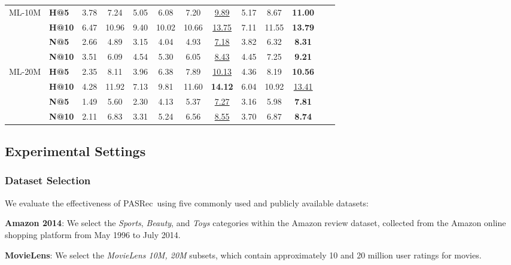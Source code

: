 \documentclass[sigconf,nonacm]{acmart}
\newcommand{\modelname}{PASRec}
\begin{document}
\begin{table}[htbp]
\begin{adjustbox}{max width=\textwidth}
\begin{tabular}{llccccccccccc}
\midrule


\multirow{4}{*}{ML-10M}
& \textbf{H@5}     & 3.78  & 7.24  & 5.05  & 6.08  & 7.20  & \underline{9.89}  & 5.17  & 8.67  & \textbf{11.00} \\
& \textbf{H@10}    & 6.47  & 10.96 & 9.40  & 10.02 & 10.66 & \underline{13.75} & 7.11  & 11.55 & \textbf{13.79} \\
& \textbf{N@5}     & 2.66  & 4.89  & 3.15  & 4.04  & 4.93  & \underline{7.18}  & 3.82  & 6.32  & \textbf{8.31} \\
& \textbf{N@10}    & 3.51  & 6.09  & 4.54  & 5.30  & 6.05  & \underline{8.43}  & 4.45  & 7.25  & \textbf{9.21} \\

\midrule

\multirow{4}{*}{ML-20M}

& \textbf{H@5}     & 2.35  & 8.11  & 3.96  & 6.38  & 7.89  & \underline{10.13}  & 4.36  & 8.19  & \textbf{10.56} \\
& \textbf{H@10}    & 4.28  & 11.92 & 7.13  & 9.81  & 11.60 & \textbf{14.12}  & 6.04  & 10.92 & \underline{13.41} \\
& \textbf{N@5}     & 1.49  & 5.60  & 2.30  & 4.13  & 5.37  & \underline{7.27}   & 3.16  & 5.98  & \textbf{7.81}  \\
& \textbf{N@10}    & 2.11  & 6.83  & 3.31  & 5.24  & 6.56  & \underline{8.55}   & 3.70  & 6.87  & \textbf{8.74}  \\
\bottomrule
\end{tabular}
\end{adjustbox}
\end{table}


\subsection{Experimental Settings}
\subsubsection{Dataset Selection}
We evaluate the effectiveness of \modelname\ using five commonly used and publicly available datasets:

\textbf{Amazon 2014\footnotemark}: 
We select the \textit{Sports}, \textit{Beauty}, and \textit{Toys} categories within the Amazon review dataset, collected from the Amazon online shopping platform from May 1996 to July 2014. 

\textbf{MovieLens\footnotemark}:  
We select the \textit{MovieLens 10M, 20M} subsets, which contain approximately 10 and 20 million user ratings for movies.
\end{document}
